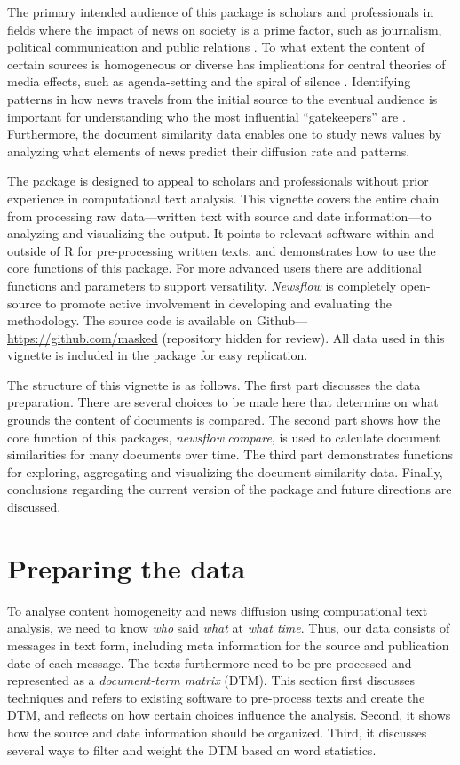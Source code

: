 The primary intended audience of this package is scholars and
professionals in fields where the impact of news on society is a prime
factor, such as journalism, political communication and public relations
\citep{baum08,boczkowski07,ragas14}. To what extent the content of
certain sources is homogeneous or diverse has implications for central
theories of media effects, such as agenda-setting and the spiral of
silence \citep{bennett08,blumler99}. Identifying patterns in how news
travels from the initial source to the eventual audience is important
for understanding who the most influential ``gatekeepers'' are
\citep{shoemaker09}. Furthermore, the document similarity data enables
one to study news values \citep{galtung65} by analyzing what elements of
news predict their diffusion rate and patterns.

The package is designed to appeal to scholars and professionals without
prior experience in computational text analysis. This vignette covers
the entire chain from processing raw data---written text with source and
date information---to analyzing and visualizing the output. It points to
relevant software within and outside of R for pre-processing written
texts, and demonstrates how to use the core functions of this package.
For more advanced users there are additional functions and parameters to
support versatility. \emph{Newsflow} is completely open-source to
promote active involvement in developing and evaluating the methodology.
The source code is available on Github---\url{https://github.com/masked}
(repository hidden for review). All data used in this vignette is
included in the package for easy replication.

The structure of this vignette is as follows. The first part discusses
the data preparation. There are several choices to be made here that
determine on what grounds the content of documents is compared. The
second part shows how the core function of this packages,
\emph{newsflow.compare}, is used to calculate document similarities for
many documents over time. The third part demonstrates functions for
exploring, aggregating and visualizing the document similarity data.
Finally, conclusions regarding the current version of the package and
future directions are discussed.

\section{Preparing the data}

To analyse content homogeneity and news diffusion using computational
text analysis, we need to know \emph{who} said \emph{what} at
\emph{what time}. Thus, our data consists of messages in text form,
including meta information for the source and publication date of each
message. The texts furthermore need to be pre-processed and represented
as a \emph{document-term matrix} (DTM). This section first discusses
techniques and refers to existing software to pre-process texts and
create the DTM, and reflects on how certain choices influence the
analysis. Second, it shows how the source and date information should be
organized. Third, it discusses several ways to filter and weight the DTM
based on word statistics.

